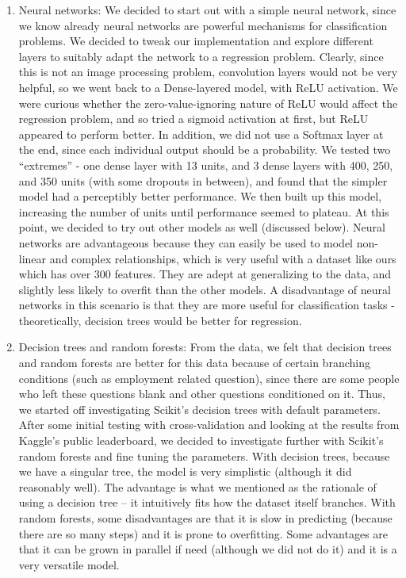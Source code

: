 \begin{enumerate}
\item Neural networks: We decided to start out with a simple neural network, since we know already neural networks are powerful mechanisms for classification problems. We decided to tweak our implementation and explore different layers to suitably adapt the network to a regression problem. Clearly, since this is not an image processing problem, convolution layers would not be very helpful, so we went back to a Dense-layered model, with ReLU activation. We were curious whether the zero-value-ignoring nature of ReLU would affect the regression problem, and so tried a sigmoid activation at first, but ReLU appeared to perform better. In addition, we did not use a Softmax layer at the end, since each individual output should be a probability. We tested two “extremes” - one dense layer with 13 units, and 3 dense layers with 400, 250, and 350 units (with some dropouts in between), and found that the simpler model had a perceptibly better performance. We then built up this model, increasing the number of units until performance seemed to plateau. At this point, we decided to try out other models as well (discussed below). Neural networks are advantageous because they can easily be used to model non-linear and complex relationships, which is very useful with a dataset like ours which has over 300 features. They are adept at generalizing to the data, and slightly less likely to overfit than the other models. A disadvantage of neural networks in this scenario is that they are more useful for classification tasks - theoretically, decision trees would be better for regression.

\item Decision trees and random forests: From the data, we felt that decision trees and random forests are better for this data because of certain branching conditions (such as employment related question), since there are some people who left these questions blank and other questions conditioned on it. Thus, we started off investigating Scikit’s decision trees with default parameters. After some initial testing with cross-validation and looking at the results from Kaggle’s public leaderboard, we decided to investigate further with Scikit’s random forests and fine tuning the parameters. With decision trees, because we have a singular tree, the model is very simplistic (although it did reasonably well). The advantage is what we mentioned as the rationale of using a decision tree -- it intuitively fits how the dataset itself branches. With random forests, some disadvantages are that it is slow in predicting (because there are so many steps) and it is prone to overfitting. Some advantages are that it can be grown in parallel if need (although we did not do it) and it is a very versatile model. 


\end{enumerate}
